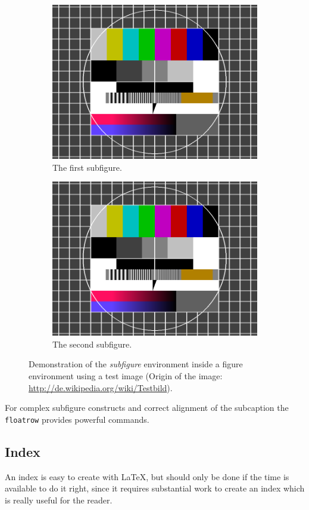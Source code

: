\begin{figure}[htb]
  \begin{subfigure}[b]{.45\linewidth}
    \centering
    \includegraphics[width=0.5\linewidth]{images/testimage.png}
    \caption{The first subfigure.}
    \label{fig:example:subfigures:a}
  \end{subfigure}%
  \begin{subfigure}[b]{.45\linewidth}
    \centering
    \includegraphics[width=0.5\linewidth]{images/testimage.png}
    \caption{The second subfigure.}
    \label{fig:example:subfigures:b}
  \end{subfigure}
  \caption{Demonstration of the \emph{subfigure} environment inside a figure environment using a test image (Origin of the image: \url{http://de.wikipedia.org/wiki/Testbild}).}
  \label{fig:example:subfigures}
\end{figure}
%
For complex subfigure constructs and correct alignment of the subcaption the \texttt{floatrow} provides powerful commands. 

\subsection{Index}
\label{sec:example:index}
%
An index is easy to create with LaTeX, but should only be done if the time is available to do it right, since it requires substantial work to create an index which is really useful for the reader.

